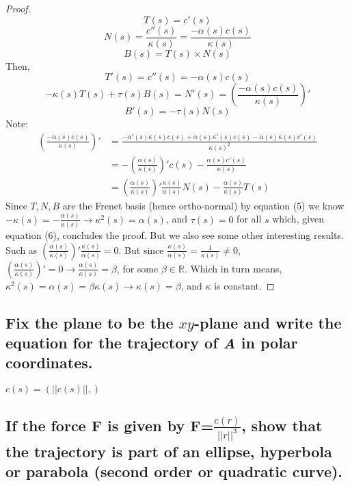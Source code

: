 \documentclass[12pt]{amsart}
\begin{document}
\begin{proof}
\begin{equation}
	T(s)=c'(s)
\end{equation}
\begin{equation}
	N(s)=\frac{c''(s)}{\kappa(s)}=\frac{-\alpha(s)c(s)}{\kappa(s)}
\end{equation}
\begin{equation}
	B(s)=T(s)\times N(s)
\end{equation}
Then,
\begin{equation}
	T'(s)=c''(s)=-\alpha(s)c(s)
\end{equation}
\begin{equation}
	-\kappa(s)T(s)+\tau(s)B(s)=N'(s)=\left(\frac{-\alpha(s)c(s)}{\kappa(s)}\right)'
\end{equation}
\begin{equation}
	B'(s)=-\tau(s)N(s)
\end{equation}
Note: 
\begin{align*}
	\left(\frac{-\alpha(s)c(s)}{\kappa(s)}\right)'&=\frac{-\alpha'(s)\kappa(s)c(s)+\alpha(s)\kappa'(s)c(s)-\alpha(s)\kappa(s)c'(s)}{\kappa(s)^2}
	\\&=-\left(\frac{\alpha(s)}{\kappa(s)}\right)'c(s)-\frac{\alpha(s)c'(s)}{\kappa(s)}
	\\&=\left(\frac{\alpha(s)}{\kappa(s)}\right)'\frac{\kappa(s)}{\alpha(s)}N(s)-\frac{\alpha(s)}{\kappa(s)}T(s)
\end{align*}
Since $T,N,B$ are the Frenet basis (hence ortho-normal) by equation (5) we know $-\kappa(s)=-\frac{\alpha(s)}{\kappa(s)}\rightarrow \kappa^2(s)=\alpha(s)$, and $\tau(s)=0$ for all $s$ which, given equation (6), concludes the proof. But we also see some other interesting results. Such as $\left(\frac{\alpha(s)}{\kappa(s)}\right)'\frac{\kappa(s)}{\alpha(s)}=0$. But since $\frac{\kappa(s)}{\alpha(s)}=\frac{1}{\kappa(s)}\neq0$, $\left(\frac{\alpha(s)}{\kappa(s)}\right)'=0\rightarrow\frac{\alpha(s)}{\kappa(s)}=\beta$, for some $\beta\in\mathbb{R}$. Which in turn means, $\kappa^2(s)=\alpha(s)=\beta\kappa(s)\rightarrow\kappa(s)=\beta$, and $\kappa$ is constant.
\end{proof}
\subsection{Fix the plane to be the $xy$-plane and write the equation for the trajectory of \emph{A} in polar coordinates.}
$c(s)=(||c(s)||, )$

\subsection{If the force \textbf{F} is given by \textbf{F}=$\frac{c(r)}{||r||^3}$, show that the trajectory is part of an ellipse, hyperbola or parabola (second order or quadratic curve).}
\end{document}
